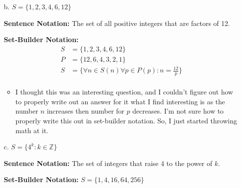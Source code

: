\documentclass{article}
\begin{document}
\begin{itemize}
\begin{itemize}
    \item[b.] $S =\{1,2,3,4,6,12\}$
    \item[] \textbf{Sentence Notation: } The set of all positive integers that are factors of 12.
    \item[] \textbf{Set-Builder Notation: } 
    \begin{align*}
        S &=\{1,2,3,4,6,12\} \\
        P &= \{12, 6, 4, 3, 2, 1\}\\ 
        S &= \{\forall n \in S(n) \forall p \in P(p) : n = \frac{12}{p} \} \\
    \end{align*}
    \begin{itemize}
        \item I thought this was an interesting question, and I couldn't figure out how to properly write out an answer for it
        what I find interesting is as the number $n$ increases then number for $p$ decreases. I'm not sure how to properly write this out in set-builder notation.
        So, I just started throwing math at it. 
    \end{itemize}
    \item[]
    \item[c.] $S = \{4^k : k \in \mathbb{Z}\}$
    \item[] \textbf{Sentence Notation: } The set of integers that raise 4 to the power of $k$.
    \item[] \textbf{Set-Builder Notation: } $S = \{1, 4, 16, 64, 256\}$
\end{itemize} 
\end{itemize} 
\end{document}
